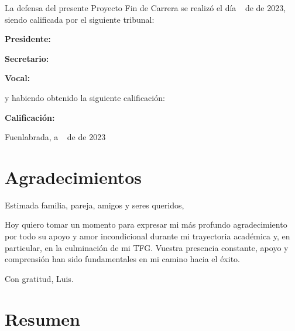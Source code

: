 \documentclass[a4paper, 12pt]{book}
\begin{document}
	\vspace{1cm}
	La defensa del presente Proyecto Fin de Carrera se realizó el día \qquad$\;\,$ de \qquad\qquad\qquad\qquad \newline de 2023, siendo calificada por el siguiente tribunal:
	
	
	\vspace{0.5cm}
	\textbf{Presidente:}
	
	\vspace{1.2cm}
	\textbf{Secretario:}
	
	\vspace{1.2cm}
	\textbf{Vocal:}
	
	
	\vspace{1.2cm}
	y habiendo obtenido la siguiente calificación:
	
	\vspace{1cm}
	\textbf{Calificación:}
	
	
	\vspace{1cm}
	\begin{flushright}
		Fuenlabrada, a \qquad$\;\,$ de \qquad\qquad\qquad\qquad de 2023
	\end{flushright}
	
	
	
	\chapter*{Agradecimientos}
	
	Estimada familia, pareja, amigos y seres queridos,
	
	Hoy quiero tomar un momento para expresar mi más profundo agradecimiento por todo su apoyo y amor incondicional durante mi trayectoria académica y, en particular, en la culminación de mi TFG. Vuestra presencia constante, apoyo y comprensión han sido fundamentales en mi camino hacia el éxito.
	
	
	Con gratitud,
	Luis.
	
	
	\chapter*{Resumen}
	
\end{document}
